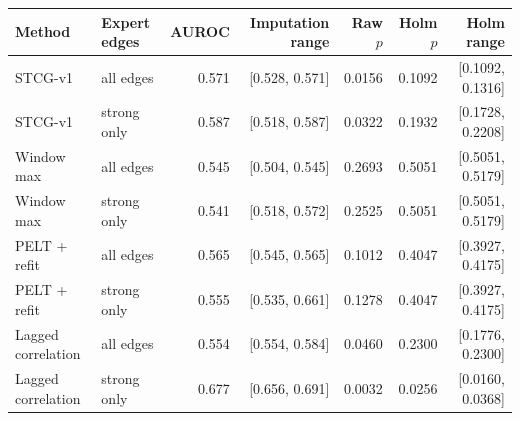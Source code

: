 \begin{tabular}{llrrrrr}
\toprule
Method & Expert edges & AUROC & Imputation range & Raw $p$ & Holm $p$ & Holm range \\
\midrule
STCG-v1 & all edges & 0.571 & [0.528, 0.571] & 0.0156 & 0.1092 & [0.1092, 0.1316] \\
STCG-v1 & strong only & 0.587 & [0.518, 0.587] & 0.0322 & 0.1932 & [0.1728, 0.2208] \\
Window max & all edges & 0.545 & [0.504, 0.545] & 0.2693 & 0.5051 & [0.5051, 0.5179] \\
Window max & strong only & 0.541 & [0.518, 0.572] & 0.2525 & 0.5051 & [0.5051, 0.5179] \\
PELT + refit & all edges & 0.565 & [0.545, 0.565] & 0.1012 & 0.4047 & [0.3927, 0.4175] \\
PELT + refit & strong only & 0.555 & [0.535, 0.661] & 0.1278 & 0.4047 & [0.3927, 0.4175] \\
Lagged correlation & all edges & 0.554 & [0.554, 0.584] & 0.0460 & 0.2300 & [0.1776, 0.2300] \\
Lagged correlation & strong only & 0.677 & [0.656, 0.691] & 0.0032 & 0.0256 & [0.0160, 0.0368] \\
\bottomrule
\end{tabular}
